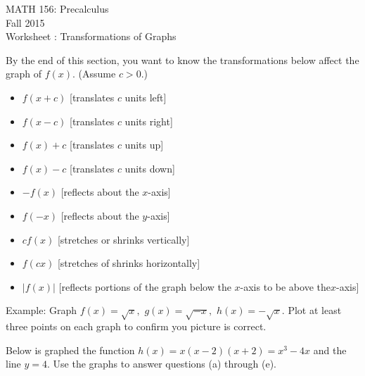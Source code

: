 \documentclass[11pt]{article}
\newcommand{\sect}{\textsection}
\begin{document}
 

\begin{center}MATH 156: Precalculus  \\ Fall 2015 \\ Worksheet \sect 2.6: Transformations of Graphs\end{center}

\hrulefill

By the end of this section, you want to  know the transformations below affect the graph of $f(x).$ (Assume $c>0.$)
\begin{itemize}
\item $f(x+c)$ [translates $c$ units left]
\item $f(x-c)$ [translates $c$ units right]
\item $f(x)+c$ [translates $c$ units up]
\item $f(x)-c$ [translates $c$ units down]
\item $-f(x)$ [reflects about the $x$-axis]
\item $f(-x)$ [reflects about the $y$-axis]
\item $cf(x)$ [stretches or shrinks vertically]
\item $f(cx)$ [stretches of shrinks horizontally]
\item $|f(x)|$ [reflects portions of the graph below the $x$-axis to be above the$x$-axis]
\end{itemize}

\hrulefill

Example: Graph $f(x)=\sqrt{x},$ $g(x)=\sqrt{-x},$ $h(x)=-\sqrt{x}.$ Plot at least three points on each graph to confirm you picture is correct.\\

\newpage

Below is graphed the function $h(x)=x(x-2)(x+2)=x^3-4x$ and the line $y=4.$ Use the graphs to answer questions (a) through (e).

\end{document}
